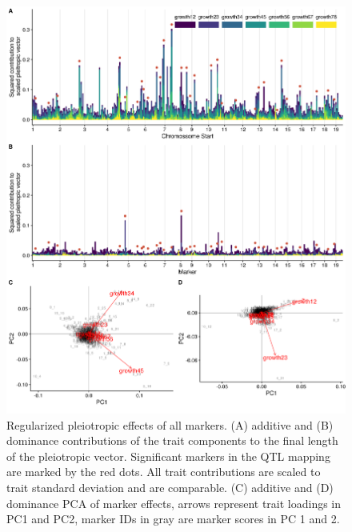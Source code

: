 \begin{refsection}
\begin{figure}
\includegraphics[width=\linewidth]{chapter_JoH-Melo_etal/media/growth_pleiotropic_partition_ad_dm_GP.png}
\caption[Pleiotropic effects of all markers]{Regularized pleiotropic effects of all markers. (A) additive
and (B) dominance contributions of the trait components to the final
length of the pleiotropic vector. Significant markers in the QTL mapping are marked by
the red dots. All trait contributions are scaled to trait standard
deviation and are comparable. (C) additive and (D) dominance PCA of marker effects, arrows
represent trait loadings in PC1 and PC2, marker IDs in gray are marker
scores in PC 1 and 2.}
\end{figure}


\end{refsection}

